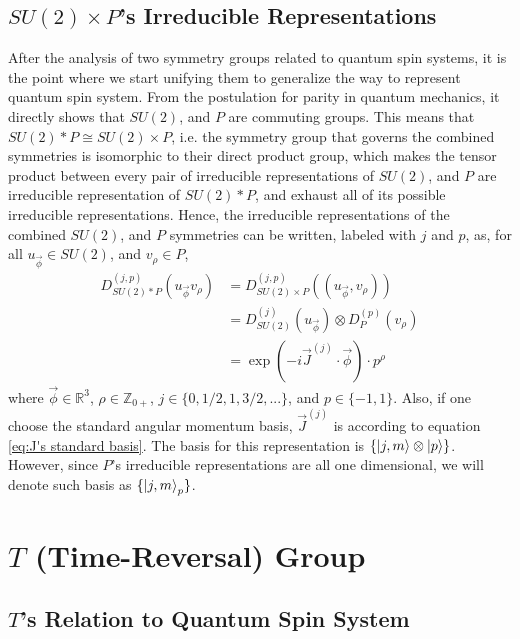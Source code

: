\documentclass[preprint, 12pt]{revtex4-2}
\numberwithin{equation}{section}
\begin{document}
\subsection{$SU(2)\times P$'s Irreducible Representations}
After the analysis of two symmetry groups related to quantum spin systems, it is the point where we start unifying them to generalize the way to represent quantum spin system. From the postulation for parity in quantum mechanics, it directly shows that $SU(2)$, and $P$ are commuting groups. This means that $SU(2)\ast P\cong SU(2)\times P$, i.e. the symmetry group that governs the combined symmetries is isomorphic to their direct product group, which makes the tensor product between every pair of irreducible representations of $SU(2)$, and $P$ are irreducible representation of $SU(2)\ast P$, and exhaust all of its possible irreducible representations. Hence, the irreducible representations of the combined $SU(2)$, and $P$ symmetries can be written, labeled with $j$ and $p$, as, for all $u_{\vec{\phi}}\in SU(2)$, and $v_\rho \in P$,
\begin{equation}\label{eq:SU2*P Irreps}
    \begin{aligned}
        D^{(j,p)}_{SU(2)\ast P}(u_{\vec{\phi}} v_\rho) &= D^{(j,p)}_{SU(2)\times P}((u_{\vec{\phi}},v_\rho)) \\
        &= D^{(j)}_{SU(2)}(u_{\vec{\phi}})\otimes D^{(p)}_{P}(v_\rho) \\
        &= \exp(-i\vec{J}^{(j)}\cdot\vec{\phi})\cdot p^\rho
    \end{aligned}
\end{equation}
where $\vec{\phi}\in\mathbb{R}^3$, $\rho\in\mathbb{Z}_{0+}$, $j\in\{0, 1/2, 1, 3/2, ...\}$, and $p\in\{-1, 1\}$. Also, if one choose the standard angular momentum basis, $\vec{J}^{(j)}$ is according to equation \ref{eq:J's standard basis}. The basis for this representation is $\{\ket{j,m}\otimes\ket{p}\}$. However, since $P$'s irreducible representations are all one dimensional, we will denote such basis as $\{\ket{j,m}_p\}$.

\newpage
\section{$T$ (Time-Reversal) Group}

\subsection{$T$'s Relation to Quantum Spin System}
\end{document}
